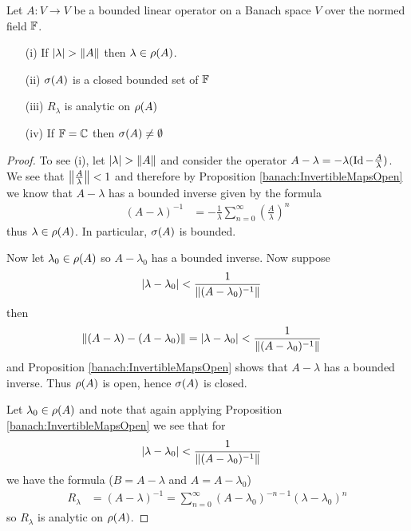 \begin{prop}\label{BoundedLinearResolventSetOpen}Let $A : V \to V$ be a bounded linear operator on a Banach  space $V$ over the normed field $\mathbb{F}$.  
\begin{itemize}
\item[(i)] If $\left \vert \lambda \right \vert > \left \lVert A \right \rVert$ then $\lambda \in \rho(A)$.
\item[(ii)] $\sigma(A)$ is a closed bounded set of $\mathbb{F}$
\item[(iii)] $R_\lambda$ is analytic on $\rho(A)$
\item[(iv)] If $\mathbb{F} = \mathbb{C}$ then $\sigma(A) \neq \emptyset$
\end{itemize}
\end{prop}
\begin{proof}
To see (i), let $\left \vert \lambda \right \vert > \left \lVert A \right \rVert$ and consider the operator $A - \lambda = -\lambda (\operatorname*{Id} - \frac{A}{\lambda})$.  We see that $\left \lVert \frac{A}{\lambda} \right \rVert < 1$ and therefore by Proposition \ref{banach:InvertibleMapsOpen} we know that $A - \lambda$ has a bounded inverse given by the formula
\begin{align*}
(A - \lambda)^{-1} &= -\frac{1}{\lambda} \sum_{n=0}^\infty \left( \frac{A}{\lambda} \right)^n
\end{align*}
thus $\lambda \in \rho(A)$.  In particular, $\sigma(A)$ is bounded.

Now let $\lambda_0 \in \rho(A)$ so $A -\lambda_0$ has a bounded inverse.  Now suppose 
\begin{align*}
\left \vert \lambda - \lambda_0 \right \vert  &< \frac{1}{\left \lVert (A-\lambda_0)^{-1} \right \rVert}
\end{align*}
then 
\begin{align*}
\left \lVert (A - \lambda) - (A - \lambda_0) \right \rVert &= \left \vert \lambda - \lambda_0 \right \vert < \frac{1}{\left \lVert (A-\lambda_0)^{-1} \right \rVert}
\end{align*}
and Proposition \ref{banach:InvertibleMapsOpen} shows that $A- \lambda$ has a bounded inverse.  Thus $ \rho(A)$ is open, hence $\sigma(A)$ is closed.

Let $\lambda_0 \in \rho(A)$ and note that again applying Proposition \ref{banach:InvertibleMapsOpen} we see that for 
\begin{align*}
\left \vert \lambda - \lambda_0 \right \vert  &< \frac{1}{\left \lVert (A-\lambda_0)^{-1} \right \rVert}
\end{align*}
we have the formula ($B = A - \lambda$ and $A = A - \lambda_0$)
\begin{align*}
R_\lambda &= (A - \lambda)^{-1} = \sum_{n=0}^\infty (A- \lambda_0)^{-n-1} (\lambda - \lambda_0)^n
\end{align*}
so $R_\lambda$ is analytic on $\rho(A)$.  


\end{proof}
